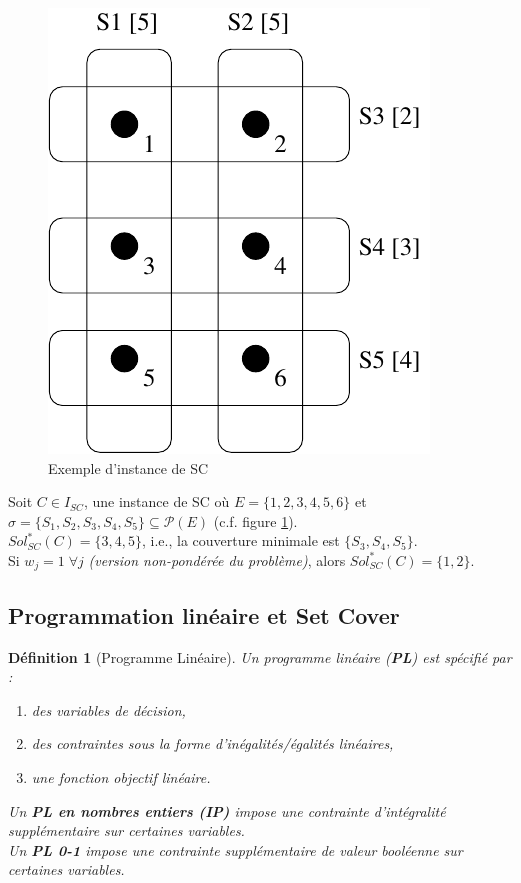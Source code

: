 \documentclass[12pt]{article}
\newcommand{\titre}[1]{\textcolor{title}{#1}}
\newtheorem{de}{D\'efinition}[section]
\begin{document}
\begin{figure}[h!]
    \begin{center}
    \includegraphics[scale=0.5]{inst_sc.pdf}
    \caption{Exemple d'instance de \titre{SC}}
		\label{scex}
    \end{center}
\end{figure}

Soit $C \in I_{SC}$, une instance de SC où $E = \{1, 2, 3, 4, 5, 6\}$ et $\sigma = \{S_1, S_2, S_3, S_4, S_5\} \subseteq \mathcal{P}(E)$ (c.f. figure \ref{scex}).\\
$Sol^*_{SC}(C) = \{3,4,5\}$, i.e., la couverture minimale est $\{S_3, S_4, S_5 \}$.\\
Si $w_j = 1 \; \forall j$ \textit{(version non-pondérée du problème)},
alors $Sol^*_{SC}(C) = \{1,2\}$.

\subsection{Programmation linéaire et Set Cover}

\begin{de}[Programme Linéaire]
Un programme linéaire (\titre{\textbf{PL}}) est spécifié par :
\begin{enumerate}
\item des variables de décision,
\item des contraintes sous la forme d'inégalités/égalités linéaires,
\item une fonction objectif linéaire.
\end{enumerate}
Un \textbf{\titre{PL} en nombres entiers (\titre{IP})} impose une contrainte
d'intégralité supplémentaire sur certaines variables.\\
Un \textbf{\titre{PL} 0-1} impose une contrainte supplémentaire de valeur
booléenne sur certaines variables.\\
\end{de}
\end{document}
